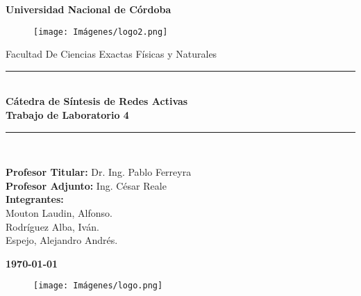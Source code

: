 \begin{titlepage}
	
	\begin{center}
		{\LARGE \textbf{Universidad Nacional de Córdoba}}\\
		\begin{figure}[h]
			\centering
			\texttt{[image: Imágenes/logo2.png]}
		\end{figure}
		
		{\large Facultad De Ciencias Exactas Físicas y Naturales}
		
		\rule{\linewidth}{0.3mm}\\
		\vspace{5mm}
		{{\large \textbf{Cátedra de Síntesis de Redes Activas}}}\\
		\vspace{5mm}
		{{\LARGE \textbf{Trabajo de Laboratorio 4}}}
		\rule{\linewidth}{0.3mm}\\
		
		\vspace{10mm}
		
		{\large {\textbf{Profesor Titular:} Dr. Ing. Pablo Ferreyra}\\
        {\textbf{Profesor Adjunto:} Ing. César Reale}\\
		{\textbf{Integrantes:\\} Mouton Laudin, Alfonso.\\Rodríguez Alba, Iván.\\
Espejo, Alejandro Andrés.}\\}
		
		\vspace{10mm}
		
		\textbf{\monthyeardate\today}

        \vspace{10mm}

        \begin{figure}[h]
			\centering
			\texttt{[image: Imágenes/logo.png]}
		\end{figure}
		
	\end{center}
	

\end{titlepage}
